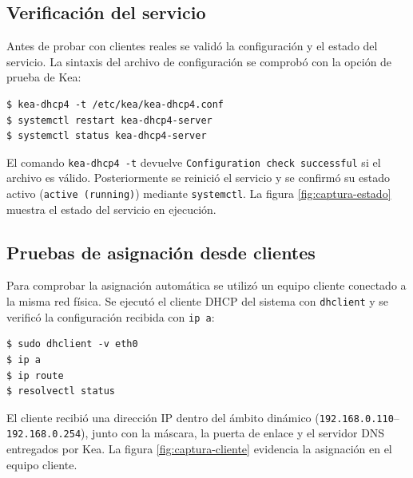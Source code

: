\subsection{Verificación del servicio}

Antes de probar con clientes reales se validó la configuración y el estado
del servicio. La sintaxis del archivo de configuración se comprobó con la
opción de prueba de Kea:

\begin{lstlisting}[style=terminal]
$ kea-dhcp4 -t /etc/kea/kea-dhcp4.conf
$ systemctl restart kea-dhcp4-server
$ systemctl status kea-dhcp4-server
\end{lstlisting}

El comando \texttt{kea-dhcp4 -t} devuelve \texttt{Configuration check
successful} si el archivo es válido. Posteriormente se reinició el servicio y
se confirmó su estado activo (\texttt{active (running)}) mediante
\texttt{systemctl}. La figura \ref{fig:captura-estado} muestra el estado del
servicio en ejecución.


\subsection{Pruebas de asignación desde clientes}

Para comprobar la asignación automática se utilizó un equipo cliente conectado
a la misma red física. Se ejecutó el cliente DHCP del sistema con
\texttt{dhclient} y se verificó la configuración recibida con \texttt{ip a}:

\begin{lstlisting}[style=terminal]
$ sudo dhclient -v eth0
$ ip a
$ ip route
$ resolvectl status
\end{lstlisting}

El cliente recibió una dirección IP dentro del ámbito dinámico
(\texttt{192.168.0.110}--\texttt{192.168.0.254}), junto con la máscara, la
puerta de enlace y el servidor DNS entregados por Kea. La figura
\ref{fig:captura-cliente} evidencia la asignación en el equipo cliente.


